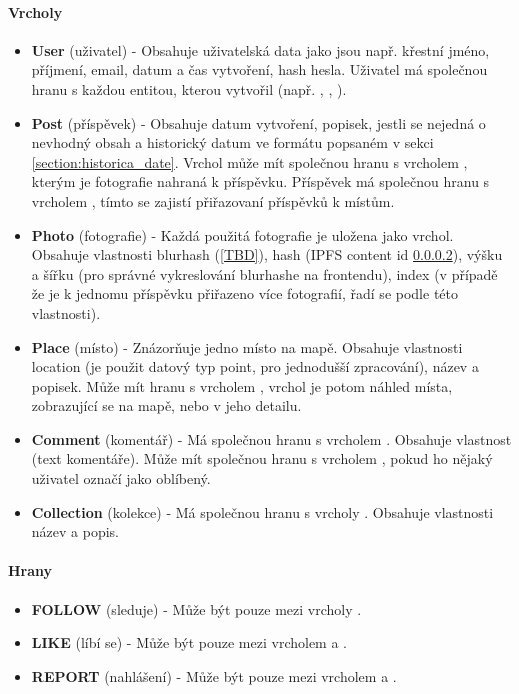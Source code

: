\documentclass[12pt, a4paper,
 twoside,        %
 openright
]{report}
\begin{document}
            \paragraph{Vrcholy}
                \begin{itemize}
    	            \item \textbf{User} (uživatel) - Obsahuje uživatelská data jako jsou např. křestní jméno, příjmení, email, datum a čas vytvoření, hash hesla. Uživatel má společnou hranu  s každou entitou, kterou vytvořil (např. , , ).
    	            \item \textbf{Post} (příspěvek) - Obsahuje datum vytvoření, popisek, jestli se nejedná o nevhodný obsah a historický datum ve formátu popsaném v sekci \ref{section:historica_date}. Vrchol  může mít společnou hranu  s vrcholem , kterým je fotografie nahraná k příspěvku. Příspěvek má společnou hranu  s vrcholem , tímto se zajistí přiřazovaní příspěvků k místům.
    	            \item \textbf{Photo} (fotografie) - Každá použitá fotografie je uložena jako vrchol. Obsahuje vlastnosti blurhash (\ref{TBD}), hash (IPFS content id \ref{}), výšku a šířku (pro správné vykreslování blurhashe na frontendu), index (v případě že je k jednomu příspěvku přiřazeno více fotografií, řadí se podle této vlastnosti).
    	            \item \textbf{Place} (místo) - Znázorňuje jedno místo na mapě. Obsahuje vlastnosti location (je použit datový typ point, pro jednodušší zpracování), název a popisek. Může mít hranu  s vrcholem , vrchol  je potom náhled místa, zobrazující se na mapě, nebo v jeho detailu.
    	            \item \textbf{Comment} (komentář) - Má společnou hranu  s vrcholem . Obsahuje vlastnost  (text komentáře). Může mít společnou hranu  s vrcholem , pokud ho nějaký uživatel označí jako oblíbený.
    	            \item \textbf{Collection} (kolekce) - Má společnou hranu  s vrcholy . Obsahuje vlastnosti název a popis.
            	\end{itemize}
            \paragraph{Hrany}
                \begin{itemize}
    	            \item \textbf{FOLLOW} (sleduje) - Může být pouze mezi vrcholy .
    	            \item \textbf{LIKE} (líbí se) - Může být pouze mezi vrcholem  a .
    	            \item \textbf{REPORT} (nahlášení) - Může být pouze mezi vrcholem  a .
                \end{itemize}
\end{document}

